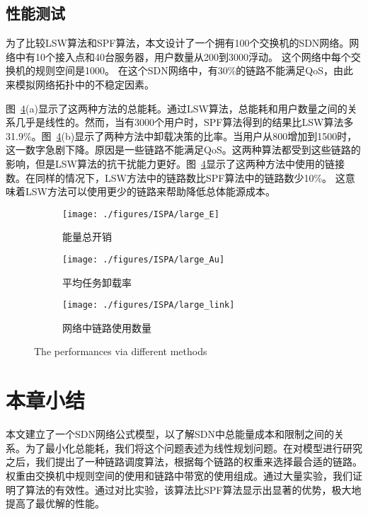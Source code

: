 \subsection{性能测试}

为了比较LSW算法和SPF算法，本文设计了一个拥有100个交换机的SDN网络。网络中有10个接入点和40台服务器，用户数量从200到3000浮动。 这个网络中每个交换机的规则空间是1000。 在这个SDN网络中，有30\%的链路不能满足QoS，由此来模拟网络拓扑中的不稳定因素。

图~\ref{fig_large}(a)显示了这两种方法的总能耗。通过LSW算法，总能耗和用户数量之间的关系几乎是线性的。然而，当有3000个用户时，SPF算法得到的结果比LSW算法多31.9\%。图~\ref{fig_large}(b)显示了两种方法中卸载决策的比率。当用户从800增加到1500时，这一数字急剧下降。原因是一些链路不能满足QoS。这两种算法都受到这些链路的影响，但是LSW算法的抗干扰能力更好。图~\ref{fig_large}显示了这两种方法中使用的链接数。在同样的情况下，LSW方法中的链路数比SPF算法中的链路数少10\%。 这意味着LSW方法可以使用更少的链路来帮助降低总体能源成本。

\begin{figure}[!h]
  \centering
  \begin{subfigure}[b]{0.32\linewidth}
    \texttt{[image: ./figures/ISPA/large\_E]}
    \label{fig_largeE}
    \caption{能量总开销}
  \end{subfigure}
  \begin{subfigure}[b]{0.32\linewidth}
    \texttt{[image: ./figures/ISPA/large\_Au]}
    \label{fig_largeAu}
    \caption{平均任务卸载率}
  \end{subfigure}
  \begin{subfigure}[b]{0.32\linewidth}
    \texttt{[image: ./figures/ISPA/large\_link]}
    \label{fig_largeL}
    \caption{网络中链路使用数量}
  \end{subfigure}
  \caption{The performances via different methods}
  \label{fig_large}
\end{figure}

\section{本章小结}

本文建立了一个SDN网络公式模型，以了解SDN中总能量成本和限制之间的关系。为了最小化总能耗，我们将这个问题表述为线性规划问题。在对模型进行研究之后，我们提出了一种链路调度算法，根据每个链路的权重来选择最合适的链路。权重由交换机中规则空间的使用和链路中带宽的使用组成。通过大量实验，我们证明了算法的有效性。通过对比实验，该算法比SPF算法显示出显著的优势，极大地提高了最优解的性能。


